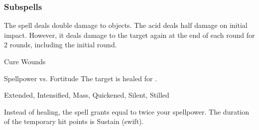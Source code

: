 \subsubsection{Subspells}
The spell deals double damage to objects.
The acid deals half damage on initial impact.
However, it deals damage to the target again at the end of each round for 2 rounds, including the initial round.
\begin{spellsection}{Cure Wounds}
\begin{spellcontent}
\begin{spelltargetinginfo}
\end{spelltargetinginfo}
\begin{spelleffects}
\begin{spellattack}{Spellpower vs. Fortitude}
\spellsuccess The target is healed for \spelldamage{}.
\end{spellattack}
\end{spelleffects}
\end{spellcontent}
\begin{spellfooter}
 Extended, Intensified, Mass, Quickened, Silent, Stilled
\end{spellfooter}
\begin{spellsubcontent}
\begin{spellcantrip}
Instead of healing, the spell grants  equal to twice your spellpower.
The duration of the temporary hit points is Sustain (swift).
\end{spellcantrip}
\end{spellsubcontent}
\end{spellsection}
